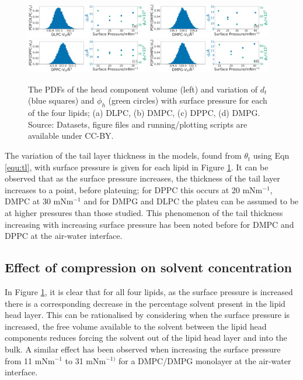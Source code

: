 \documentclass[twoside,twocolumn,9pt]{article}
\begin{document}
%
\begin{figure}
	\centering
	\includegraphics[width=0.48\textwidth]{figures/DLPC_other_data}
	\includegraphics[width=0.48\textwidth]{figures/DMPC_other_data}
	\includegraphics[width=0.48\textwidth]{figures/DPPC_other_data}
	\includegraphics[width=0.48\textwidth]{figures/DMPG_other_data}
	\caption{The PDFs of the head component volume (left) and variation of $d_t$ (blue squares) and $\phi_h$ (green circles) with surface pressure for each of the four lipids; (a) DLPC, (b) DMPC, (c) DPPC, (d) DMPG. Source: Datasets, figure files and running/plotting scripts are available under CC-BY.\cite{mccluskey_2018}}
	\label{fig:lipresults}
\end{figure}
%
The variation of the tail layer thickness in the models, found from $\theta_t$ using Eqn \ref{equ:tl}, with surface pressure is given for each lipid in Figure \ref{fig:lipresults}. It can be observed that as the surface pressure increases, the thickness of the tail layer increases to a point, before plateuing; for DPPC this occurs at 20 mNm$^{-1}$, DMPC at 30 mNm$^{-1}$ and for DMPG and DLPC the plateu can be assumed to be at higher pressures than those studied. This phenomenon of the tail thickness increasing with increasing surface pressure has been noted before for DMPC\cite{Bayerl1990} and DPPC\cite{Campbell2018} at the air-water interface.

\subsection{Effect of compression on solvent concentration}
In Figure \ref{fig:lipresults}, it is clear that for all four lipids, as the surface pressure is increased there is a corresponding decrease in the percentage solvent present in the lipid head layer. This can be rationalised by considering when the surface pressure is increased, the free volume available to the solvent between the lipid head components reduces forcing the solvent out of the lipid head layer and into the bulk. A similar effect has been observed when increasing the surface pressure from 11 mNm$^{-1}$ to 31 mNm$^{-1)}$ for a DMPC/DMPG monolayer at the air-water interface.\cite{Bayerl1990}
\end{document}
